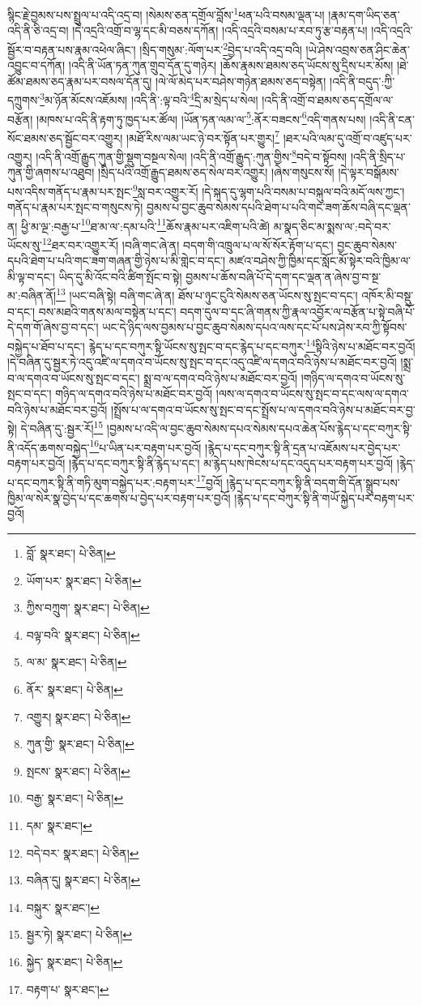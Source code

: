 སྙིང་རྗེ་བྱམས་པས་སྤྲུལ་པ་འདི་འདྲ་བ། །སེམས་ཅན་དགྲོལ་བློས་\footnote{བློ་  སྣར་ཐང་།  པེ་ཅིན། }ཕན་པའི་བསམ་ལྡན་པ། །རྣམ་དག་ཡིད་ཅན་འདི་ནི་ཅི་འདྲ་བ། །དེ་འདྲའི་འགྲོ་བ་ལྷ་དང་མི་བཅས་དཀོན། །འདི་འདྲའི་བསམ་པ་རབ་ཏུ་རྩ་བརྟན་པ། །འདི་འདྲའི་སྦྱོར་བ་བརྟན་པས་རྣམ་འཕེལ་ཞིང་། །སྲིད་གསུམ་:ལོག་པར་\footnote{ཡོག་པར་  སྣར་ཐང་།  པེ་ཅིན། }བྱེད་པ་འདི་འདྲ་བའི། །ཡེ་ཤེས་འབྲས་ཅན་ཤིང་ཆེན་འབྱུང་བ་དཀོན། །འདི་ནི་ཡོན་ཏན་ཀུན་གྲུབ་དོན་དུ་གཉེར། །ཆོས་རྣམས་ཐམས་ཅད་ཡོངས་སུ་དྲིས་པར་མོས། །ཐེ་ཚོམ་ཐམས་ཅད་རྣམ་པར་བསལ་དོན་དུ། །ལེ་ལོ་མེད་པར་བཤེས་གཉེན་ཐམས་ཅད་བསྟེན། །འདི་ནི་བདུད་:ཀྱི་དཀྲུགས་\footnote{ཀྱིས་བཀྲུག་  སྣར་ཐང་།  པེ་ཅིན། }མ་ཉོན་མོངས་འཇོམས། །འདི་ནི་:ལྟ་བའི་\footnote{བལྟ་བའི་  སྣར་ཐང་།  པེ་ཅིན། }དྲི་མ་སྲེད་པ་སེལ། །འདི་ནི་འགྲོ་བ་ཐམས་ཅད་དགྲོལ་ལ་བརྩོན། །མཁས་པ་འདི་ནི་རྟག་ཏུ་ཁྱད་པར་ཚོལ། །ཡོན་ཏན་ལམ་ལ་\footnote{ལ་མ་  སྣར་ཐང་།  པེ་ཅིན། }:ནོར་བཟངས་\footnote{ནོར་  སྣར་ཐང་།  པེ་ཅིན། }འདི་གནས་པས། །འདི་ནི་ངན་སོང་ཐམས་ཅད་སྦྱོང་བར་འགྱུར། །མཐོ་རིས་ལམ་ཡང་ཉེ་བར་སྟོན་པར་གྱུར།\footnote{འགྱུར།  སྣར་ཐང་།  པེ་ཅིན། } །ཐར་པའི་ལམ་དུ་འགྲོ་བ་འཛུད་པར་འགྱུར། །འདི་ནི་འགྲོ་རྒྱུད་ཀུན་གྱི་སྡུག་བསྔལ་སེལ། །འདི་ནི་འགྲོ་རྒྱུད་:ཀུན་གྱིས་\footnote{ཀུན་གྱི་  སྣར་ཐང་།  པེ་ཅིན། }བདེ་བ་སྟོབས། །འདི་ནི་སྲིད་པ་ཀུན་གྱི་ཞགས་པ་འཐུབ། །སྲིད་པའི་འགྲོ་རྒྱུད་ཐམས་ཅད་སེལ་བར་འགྱུར། །ཞེས་གསུངས་སོ། །དེ་ལྟར་བསྒོམས་པས་འདིས་གནོད་པ་རྣམ་པར་སྤང་\footnote{སྤངས་  སྣར་ཐང་།  པེ་ཅིན། }སླ་བར་འགྱུར་རོ། །དེ་སྐད་དུ་ལྷག་པའི་བསམ་པ་བསྐུལ་བའི་མདོ་ལས་ཀྱང་། གནོད་པ་རྣམ་པར་སྤང་བ་གསུངས་ཏེ། བྱམས་པ་བྱང་ཆུབ་སེམས་དཔའི་ཐེག་པ་པའི་གང་ཟག་ཆོས་བཞི་དང་ལྡན་ན། ཕྱི་མ་ལྔ་:བརྒྱ་པ་\footnote{བརྒྱ་  སྣར་ཐང་།  པེ་ཅིན། }ཐ་མ་ལ་:དམ་པའི་\footnote{དམ་  སྣར་ཐང་། }ཆོས་རྣམ་པར་འཇིག་པའི་ཚེ། མ་སྣད་ཅིང་མ་སྨས་ལ་:བདེ་བར་ཡོངས་སུ་\footnote{བདེ་བར་  སྣར་ཐང་།  པེ་ཅིན། }ཐར་བར་འགྱུར་རོ། །བཞི་གང་ཞེ་ན། བདག་གི་འཁྲུལ་པ་ལ་སོ་སོར་རྟོག་པ་དང་། བྱང་ཆུབ་སེམས་དཔའི་ཐེག་པ་པའི་གང་ཟག་གཞན་གྱི་ཉེས་པ་མི་གླེང་བ་དང་། མཛའ་བཤེས་ཀྱི་ཁྱིམ་དང་སློང་མོ་སྟེར་བའི་ཁྱིམ་ལ་མི་ལྟ་བ་དང་། ཡིད་དུ་མི་འོང་བའི་ཚིག་སྤོང་བ་སྟེ། བྱམས་པ་ཆོས་བཞི་པོ་དེ་དག་དང་ལྡན་ན་ཞེས་བྱ་བ་སྔ་མ་:བཞིན་ནོ།\footnote{བཞིན་དུ།  སྣར་ཐང་།  པེ་ཅིན། } །ཡང་བཞི་སྟེ། བཞི་གང་ཞེ་ན། ཐོས་པ་ཉུང་ངུའི་སེམས་ཅན་ཡོངས་སུ་སྤང་བ་དང་། འཁོར་མི་བསྡུ་བ་དང་། བས་མཐའི་གནས་མལ་བསྟེན་པ་དང་། བདག་དུལ་བ་དང་ཞི་གནས་ཀྱི་རྣལ་འབྱོར་ལ་བརྩོན་པ་སྟེ་བཞི་པོ་དེ་དག་གོ་ཞེས་བྱ་བ་དང་། ཡང་དེ་ཉིད་ལས་བྱམས་པ་བྱང་ཆུབ་སེམས་དཔའ་ལས་དང་པོ་པས་ཤེས་རབ་ཀྱི་སྟོབས་བསྐྱེད་པ་ཐོབ་པ་དང་། རྙེད་པ་དང་བཀུར་སྟི་ཡོངས་སུ་སྤང་བ་དང་རྙེད་པ་དང་བཀུར་\footnote{བསྐུར་  སྣར་ཐང་། }སྟིའི་ཉེས་པ་མཐོང་བར་བྱའོ། །དེ་བཞིན་དུ་སྦྱར་ཏེ་འདུ་འཛི་ལ་དགའ་བ་ཡོངས་སུ་སྤང་བ་དང་འདུ་འཛི་ལ་དགའ་བའི་ཉེས་པ་མཐོང་བར་བྱའོ། །སྨྲ་བ་ལ་དགའ་བ་ཡོངས་སུ་སྤང་བ་དང་། སྨྲ་བ་ལ་དགའ་བའི་ཉེས་པ་མཐོང་བར་བྱའོ། །གཉིད་ལ་དགའ་བ་ཡོངས་སུ་སྤང་བ་དང་། གཉིད་ལ་དགའ་བའི་ཉེས་པ་མཐོང་བར་བྱའོ། །ལས་ལ་དགའ་བ་ཡོངས་སུ་སྤང་བ་དང་ལས་ལ་དགའ་བའི་ཉེས་པ་མཐོང་བར་བྱའོ། །སྤྲོས་པ་ལ་དགའ་བ་ཡོངས་སུ་སྤང་བ་དང་སྤྲོས་པ་ལ་དགའ་བའི་ཉེས་པ་མཐོང་བར་བྱ་སྟེ། དེ་བཞིན་དུ་:སྦྱར་རོ།\footnote{སྦྱར་ཏེ།  སྣར་ཐང་།  པེ་ཅིན། } །བྱམས་པ་འདི་ལ་བྱང་ཆུབ་སེམས་དཔའ་སེམས་དཔའ་ཆེན་པོས་རྙེད་པ་དང་བཀུར་སྟི་ནི་འདོད་ཆགས་བསྐྱེད་\footnote{སྐྱེད་  སྣར་ཐང་།  པེ་ཅིན། }པ་ཡིན་པར་བརྟག་པར་བྱའོ། །རྙེད་པ་དང་བཀུར་སྟི་ནི་དྲན་པ་འཇོམས་པར་བྱེད་པར་བརྟག་པར་བྱའོ། །རྙེད་པ་དང་བཀུར་སྟི་ནི་རྙེད་པ་དང་། མ་རྙེད་པས་ཁེངས་པ་དང་འདུད་པར་བརྟག་པར་བྱའོ། །རྙེད་པ་དང་བཀུར་སྟི་ནི་གཏི་མུག་བསྐྱེད་པར་:བརྟག་པར་\footnote{བརྟག་པ་  སྣར་ཐང་། }བྱའོ། །རྙེད་པ་དང་བཀུར་སྟི་ནི་བདག་གི་དོན་སྒྲུབ་པས་ཁྱིམ་ལ་སེར་སྣ་བྱེད་པ་དང་ཆགས་པ་བྱེད་པར་བརྟག་པར་བྱའོ། །རྙེད་པ་དང་བཀུར་སྟི་ནི་གཡོ་སྐྱེད་པར་བརྟག་པར་བྱའོ། 